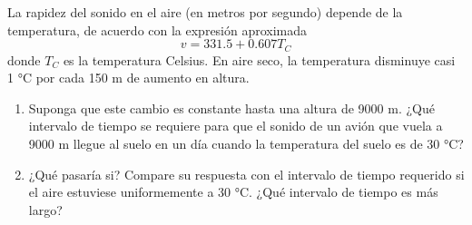 \item La rapidez del sonido en el aire (en metros por segundo) depende de la temperatura, de acuerdo con la expresión aproximada
$$ v = 331.5 + 0.607 T_C $$
donde $T_C$ es la temperatura Celsius. En aire seco, la temperatura disminuye casi 1 °C por cada 150 m de aumento en altura.
\begin{enumerate}
    \item Suponga que este cambio es constante hasta una altura de 9000 m. ¿Qué intervalo de tiempo se requiere para que el sonido de un avión que vuela a 9000 m llegue al suelo en un día cuando la temperatura del suelo es de 30 °C?
    \item ¿Qué pasaría si? Compare su respuesta con el intervalo de tiempo requerido si el aire estuviese uniformemente a 30 °C. ¿Qué intervalo de tiempo es más largo?
\end{enumerate}